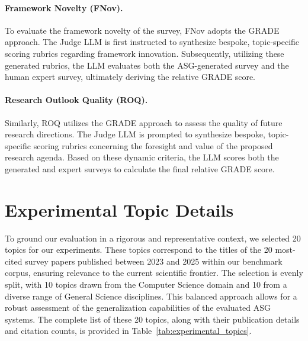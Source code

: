 \documentclass[11pt]{article}
\begin{document}
\paragraph{Framework Novelty (FNov).}
To evaluate the framework novelty of the survey, FNov adopts the GRADE approach. The Judge LLM is first instructed to synthesize bespoke, topic-specific scoring rubrics regarding framework innovation. Subsequently, utilizing these generated rubrics, the LLM evaluates both the ASG-generated survey and the human expert survey, ultimately deriving the relative GRADE score.

\paragraph{Research Outlook Quality (ROQ).}
Similarly, ROQ utilizes the GRADE approach to assess the quality of future research directions. The Judge LLM is prompted to synthesize bespoke, topic-specific scoring rubrics concerning the foresight and value of the proposed research agenda. Based on these dynamic criteria, the LLM scores both the generated and expert surveys to calculate the final relative GRADE score.

\section{Experimental Topic Details}

To ground our evaluation in a rigorous and representative context, we selected 20 topics for our experiments. These topics correspond to the titles of the 20 most-cited survey papers published between 2023 and 2025 within our benchmark corpus, ensuring relevance to the current scientific frontier. The selection is evenly split, with 10 topics drawn from the Computer Science domain and 10 from a diverse range of General Science disciplines. This balanced approach allows for a robust assessment of the generalization capabilities of the evaluated ASG systems. The complete list of these 20 topics, along with their publication details and citation counts, is provided in Table~\ref{tab:experimental_topics}.
\end{document}
